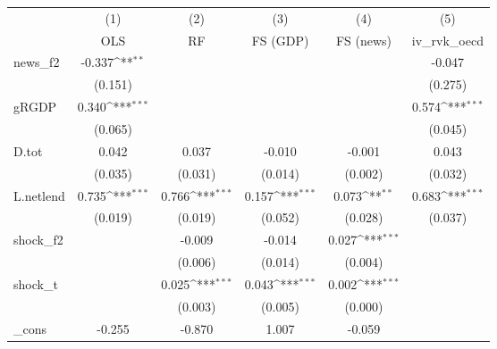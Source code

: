 {
\def\sym#1{\ifmmode^{#1}\else\(^{#1}\)\fi}
\begin{tabular}{l*{5}{c}}
\toprule
            &\multicolumn{1}{c}{(1)}&\multicolumn{1}{c}{(2)}&\multicolumn{1}{c}{(3)}&\multicolumn{1}{c}{(4)}&\multicolumn{1}{c}{(5)}\\
            &\multicolumn{1}{c}{OLS}&\multicolumn{1}{c}{RF}&\multicolumn{1}{c}{FS (GDP)}&\multicolumn{1}{c}{FS (news)}&\multicolumn{1}{c}{iv\_rvk\_oecd}\\
\midrule
news\_f2     &      -0.337\sym{**} &                     &                     &                     &      -0.047         \\
            &     (0.151)         &                     &                     &                     &     (0.275)         \\
\addlinespace
gRGDP       &       0.340\sym{***}&                     &                     &                     &       0.574\sym{***}\\
            &     (0.065)         &                     &                     &                     &     (0.045)         \\
\addlinespace
D.tot       &       0.042         &       0.037         &      -0.010         &      -0.001         &       0.043         \\
            &     (0.035)         &     (0.031)         &     (0.014)         &     (0.002)         &     (0.032)         \\
\addlinespace
L.netlend   &       0.735\sym{***}&       0.766\sym{***}&       0.157\sym{***}&       0.073\sym{**} &       0.683\sym{***}\\
            &     (0.019)         &     (0.019)         &     (0.052)         &     (0.028)         &     (0.037)         \\
\addlinespace
shock\_f2    &                     &      -0.009         &      -0.014         &       0.027\sym{***}&                     \\
            &                     &     (0.006)         &     (0.014)         &     (0.004)         &                     \\
\addlinespace
shock\_t     &                     &       0.025\sym{***}&       0.043\sym{***}&       0.002\sym{***}&                     \\
            &                     &     (0.003)         &     (0.005)         &     (0.000)         &                     \\
\addlinespace
\_cons      &      -0.255         &      -0.870         &       1.007         &      -0.059         &                     \\

\end{tabular}}
